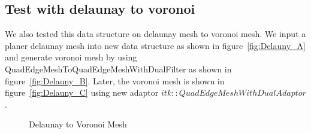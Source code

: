 \documentclass{InsightArticle}
\begin{document}
\subsection{Test with delaunay to voronoi}
We also tested this data structure on delaunay mesh to voronoi mesh. We input a planer delaunay mesh into new data structure as shown in figure~\ref{fig:Delauny_A} and generate voronoi mesh by using QuadEdgeMeshToQuadEdgeMeshWithDualFilter as shown in figure~\ref{fig:Delauny_B}. Later, the voronoi mesh is shown in figure~\ref{fig:Delauny_C} using new adaptor $itk::QuadEdgeMeshWithDualAdaptor$. \\
\begin{figure}
	\centering
	\caption{Delaunay to Voronoi Mesh}
\label{fig:delaunayToVoronoiMesh}
\end{figure}
\end{document}
